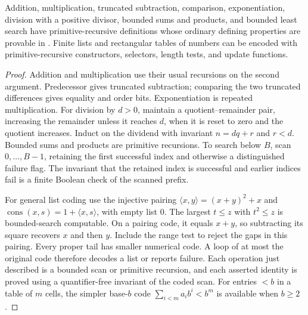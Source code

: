 \begin{lemma}\label{base:coding}
Addition, multiplication, truncated subtraction, comparison, exponentiation,
division with a positive divisor, bounded sums and products, and bounded
least search have primitive-recursive definitions whose ordinary defining
properties are provable in \ipra. Finite lists and rectangular tables of
numbers can be encoded with primitive-recursive constructors, selectors,
length tests, and update functions.
\end{lemma}
\begin{proof}
Addition and multiplication use their usual recursions on the second
argument. Predecessor gives truncated subtraction; comparing the two
truncated differences gives equality and order bits. Exponentiation is
repeated multiplication. For division by $d>0$, maintain a quotient--remainder
pair, increasing the remainder unless it reaches $d$, when it is reset to
zero and the quotient increases. Induct on the dividend with invariant
$n=dq+r$ and $r<d$. Bounded sums and products are primitive recursions.
To search below $B$, scan $0,\ldots,B-1$, retaining the first successful
index and otherwise a distinguished failure flag. The invariant that the
retained index is successful and earlier indices fail is a finite Boolean
check of the scanned prefix.

For general list coding use the injective pairing
$\langle x,y\rangle=(x+y)^2+x$ and
$\operatorname{cons}(x,s)=1+\langle x,s\rangle$, with empty list $0$.
The largest $t\le z$ with $t^2\le z$ is bounded-search computable.
On a pairing code, it equals $x+y$, so subtracting its square recovers $x$
and then $y$. Include the range test to reject the gaps in this pairing.
Every proper tail has smaller numerical code. A loop of at most the original
code therefore decodes a list or reports failure. Each operation just
described is a bounded scan or primitive recursion, and each asserted
identity is proved using a quantifier-free invariant of the coded scan.
For entries $<b$ in a table of $m$ cells, the simpler base-$b$ code
$\sum_{i<m}a_i b^i<b^m$ is available when $b\ge2$.
\end{proof}

